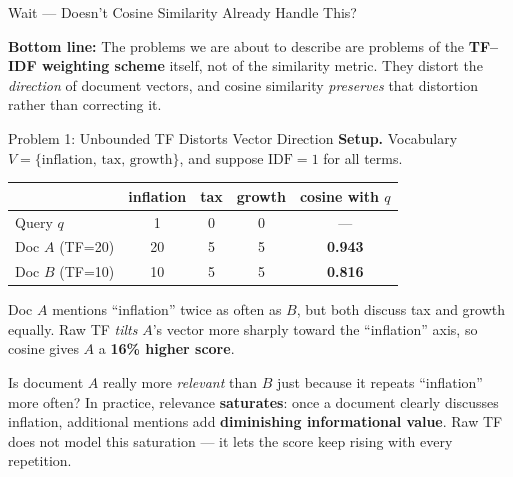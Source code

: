 \documentclass[aspectratio=169]{beamer}
\begin{document}
%
%
\begin{frame}{Wait --- Doesn't Cosine Similarity Already Handle This?}

\begin{tcolorbox}[colback=gray!8, colframe=gray!60]
\textbf{Bottom line:} The problems we are about to describe
are problems of the \textbf{TF--IDF weighting scheme} itself,
not of the similarity metric.  They distort the \emph{direction}
of document vectors, and cosine similarity
\emph{preserves} that distortion rather than correcting it.
\end{tcolorbox}

\end{frame}
%
%
\begin{frame}{Problem 1: Unbounded TF Distorts Vector Direction}
\small
\textbf{Setup.} Vocabulary $V = \{\text{inflation},\, \text{tax},\,
\text{growth}\}$, and suppose $\text{IDF} = 1$ for all terms.

\medskip

\begin{center}
\renewcommand{\arraystretch}{1.2}
\begin{tabular}{l c c c c}
\hline
& inflation & tax & growth & cosine with $q$ \\
\hline
Query $q$  & 1  & 0  & 0 & ---  \\
Doc $A$ (TF=20) & 20 & 5  & 5 & \textbf{0.943} \\
Doc $B$ (TF=10) & 10 & 5  & 5 & \textbf{0.816} \\
\hline
\end{tabular}
\end{center}

\medskip
Doc $A$ mentions ``inflation'' twice as often as $B$,
but both discuss tax and growth equally.
Raw TF \emph{tilts} $A$'s vector more sharply toward the
``inflation'' axis, so cosine gives $A$ a \textbf{16\% higher score}.

\bigskip

\begin{tcolorbox}[colback=red!5!white, colframe=red!70!black,
  title=\textbf{The saturation problem}]
Is document $A$ really more \emph{relevant} than $B$
just because it repeats ``inflation'' more often?
In practice, relevance \textbf{saturates}: once a document
clearly discusses inflation, additional mentions add
\textbf{diminishing informational value}.
Raw TF does not model this saturation ---
it lets the score keep rising with every repetition.
\end{tcolorbox}

\end{frame}
\end{document}
